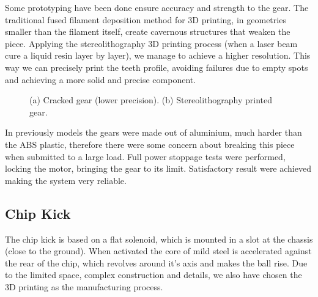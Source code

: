 Some prototyping have been done ensure accuracy and strength to the gear. The traditional fused filament deposition method for 3D printing, in geometries smaller than the filament itself, create cavernous structures that weaken the piece. Applying the stereolithography 3D printing process (when a laser beam cure a liquid resin layer by layer), we manage to achieve a higher resolution. This way we can precisely print the teeth profile, avoiding failures due to empty spots and achieving a more solid and precise component.

\begin{figure}[!htb]
	\centering
	\caption{(a) Cracked gear (lower precision). (b) Stereolithography printed gear.}
	\label{mec3}
\end{figure}

In previously models the gears were made out of aluminium, much harder than the ABS plastic, therefore there were some concern about breaking this piece when submitted to a large load.
Full power stoppage tests were performed, locking the motor, bringing the gear to its limit. Satisfactory result were achieved making the system very reliable.

\subsection{Chip Kick}

The chip kick is based on a flat solenoid, which is mounted in a slot at the chassis (close to the ground). When activated the core of mild steel is accelerated against the rear of the chip, which revolves around it's axis and makes the ball rise. Due to the limited space, complex construction and details, we also have chosen the 3D printing as the manufacturing process.

